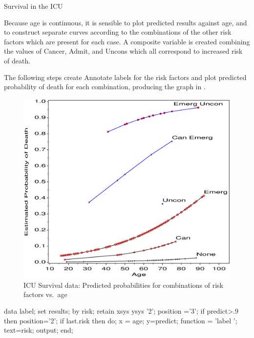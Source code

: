 \begin{Example}[icu1]{Survival in the ICU}
\begin{Output}[htb]
\caption{ICU data: Parameter estimates}\label{out:icu1.1}
\small

\end{Output}
Because age is continuous, it is sensible to plot predicted
results against age, and to construct separate curves according
to the combinations of the other risk factors which are present
for each case.   A  composite variable  is created
combining the values of Cancer, Admit, and Uncons which all correspond
to increased risk of death.
The following steps create Annotate labels for the risk factors
and plot predicted probability of death for each combination,
producing the graph in .
\begin{figure}[htb]
  \centering
  \includegraphics[scale=.6]{ch6/fig/icu11}
  \caption[ICU Survival data: Predicted probabilities]{ICU Survival data: Predicted probabilities for combinations of risk factors vs.\ age}%
  \label{fig:icu11}
\end{figure}
\begin{listing}
data label;
   set results;
   by risk;
   retain xsys ysys '2';
   position ='3';
   if predict>.9 then position='2';
   if last.risk then do;
      x = age;  y=predict;
      function = 'label   ';
      text=risk;
      output;
      end;


\end{listing}
\end{Example}
